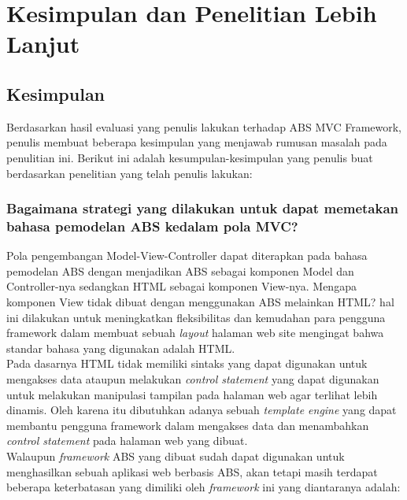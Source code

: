 \chapter{Kesimpulan dan Penelitian Lebih Lanjut}

\section{Kesimpulan}
Berdasarkan hasil evaluasi yang penulis lakukan terhadap ABS MVC Framework, penulis membuat beberapa kesimpulan yang menjawab rumusan masalah pada penulitian ini. Berikut ini adalah kesumpulan-kesimpulan yang penulis buat berdasarkan penelitian yang telah penulis lakukan:

\subsection{Bagaimana strategi yang dilakukan untuk dapat memetakan bahasa pemodelan ABS kedalam pola MVC?}

Pola pengembangan Model-View-Controller dapat diterapkan pada bahasa pemodelan ABS dengan menjadikan ABS sebagai komponen Model dan Controller-nya sedangkan HTML sebagai komponen View-nya. Mengapa komponen View tidak dibuat dengan menggunakan ABS melainkan HTML? hal ini dilakukan untuk meningkatkan fleksibilitas dan kemudahan para pengguna framework dalam membuat sebuah \textit{layout} halaman web site mengingat bahwa standar bahasa yang digunakan adalah HTML.\\

Pada dasarnya HTML tidak memiliki sintaks yang dapat digunakan untuk mengakses data ataupun melakukan \textit{control statement} yang dapat digunakan untuk melakukan manipulasi tampilan pada halaman web agar terlihat lebih dinamis. Oleh karena itu dibutuhkan adanya sebuah \textit{template engine} yang dapat membantu pengguna framework dalam mengakses data dan menambahkan \textit{control statement} pada halaman web yang dibuat.\\

Walaupun \textit{framework} ABS yang dibuat sudah dapat digunakan untuk menghasilkan sebuah aplikasi web berbasis ABS, akan tetapi masih terdapat beberapa keterbatasan yang dimiliki oleh \textit{framework} ini yang diantaranya adalah:

